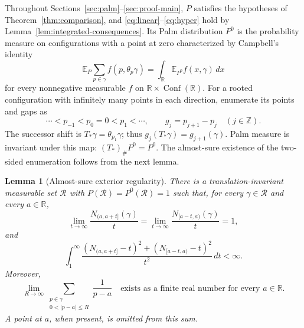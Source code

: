 \documentclass[11pt,reqno]{amsart}
\numberwithin{equation}{section}
\newtheorem{lemma}[theorem]{Lemma}
\theoremstyle{definition}
\theoremstyle{remark}
\newcommand{\R}{\mathbb R}
\newcommand{\Z}{\mathbb Z}
\newcommand{\E}{\mathbb E}
\newcommand{\1}{\mathbf 1}
\newcommand{\Conf}{\operatorname{Conf}}
\newcommand{\dd}{\,d}
\begin{document}
Throughout Sections~\ref{sec:palm}--\ref{sec:proof-main}, $P$ satisfies
the hypotheses of Theorem~\ref{thm:comparison}, and
\eqref{eq:linear}--\eqref{eq:hyper} hold by
Lemma~\ref{lem:integrated-consequences}. Its Palm distribution $P^0$ is the
probability measure on configurations with a point at zero characterized
by Campbell's identity
\begin{equation}\label{eq:campbell}
\E_P\sum_{p\in\gamma} f(p,\theta_p\gamma)
 =\int_\R\E_{P^0}f(x,\gamma)\dd x
\end{equation}
for every nonnegative measurable $f$ on $\R\times\Conf(\R)$.
For a rooted configuration with infinitely many points in each
direction, enumerate its points and gaps as
\begin{equation}\label{eq:palm-points-gaps}
\cdots<p_{-1}<p_0=0<p_1<\cdots,\qquad
 g_j=p_{j+1}-p_j\quad(j\in\Z).
\end{equation}
The successor shift is $T_*\gamma=\theta_{p_1}\gamma$; thus
$g_j(T_*\gamma)=g_{j+1}(\gamma)$. Palm measure is invariant under this
map: $(T_*)_\#P^0=P^0$. The almost-sure existence of the two-sided
enumeration follows from the next lemma.

\begin{samepage}
\begin{lemma}[Almost-sure exterior regularity]\label{lem:as-regularity}
There is a translation-invariant measurable set $\mathcal R$ with
$P(\mathcal R)=P^0(\mathcal R)=1$ such that, for every
$\gamma\in\mathcal R$ and every $a\in\R$,
\begin{equation}\label{eq:as-density}
\lim_{t\to\infty}\frac{N_{(a,a+t]}(\gamma)}t
 =\lim_{t\to\infty}\frac{N_{[a-t,a)}(\gamma)}t=1,
\end{equation}
and
\begin{equation}\label{eq:as-integral}
\int_1^\infty\frac{
  (N_{(a,a+t]}-t)^2+(N_{[a-t,a)}-t)^2}{t^2}\dd t<\infty.
\end{equation}
Moreover,
\begin{equation}\label{eq:reciprocal-pv}
\lim_{R\to\infty}
\sum_{\substack{p\in\gamma\\0<|p-a|\le R}}\frac1{p-a}
\quad\text{exists as a finite real number for every }a\in\R.
\end{equation}
A point at $a$, when present, is omitted from this sum.
\end{lemma}
\end{samepage}
\end{document}
